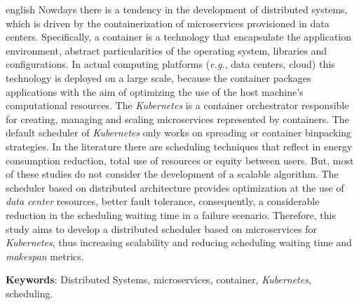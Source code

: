 \begin{resumo}[Abstract]
 \begin{otherlanguage*}{english}
   Nowdays there is a tendency in the development of distributed systems, which is driven by the containerization of microservices provisioned in data centers. Specifically, a container is a technology that encapsulate the application environment, abstract particularities of the operating system, libraries and configurations. In actual computing platforms (\textit{e.g.}, data centers, cloud) this technology is deployed on a large scale, because the container packages applications with the aim of optimizing the use of the host machine's computational resources. The \textit{Kubernetes} is a container orchestrator responsible for creating, managing and scaling microservices represented by containers. The default scheduler of \textit{Kubernetes} only works on spreading or container binpacking strategies. In the literature there are scheduling techniques that reflect in energy consumption reduction, total use of resources or equity between users. But, most of these studies do not consider the development of a scalable algorithm. The scheduler based on distributed architecture provides optimization at the use of \textit{data center} resources, better fault tolerance, consequently, a considerable reduction in the scheduling waiting time in a failure scenario. Therefore, this study aims to develop a distributed scheduler based on microservices for \textit{Kubernetes}, thus increasing scalability and reducing scheduling waiting time and \textit{makespan} metrics.
   \vspace{\onelineskip}
 
   \noindent 
   \textbf{Keywords}: Distributed Systems, microservices, container, \textit{Kubernetes}, scheduling.
 \end{otherlanguage*}
\end{resumo}

